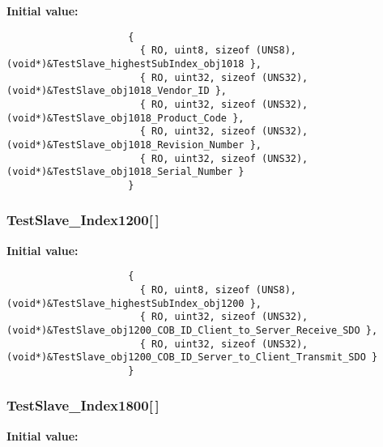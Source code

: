 \textbf{Initial value:}

\begin{Code}\begin{verbatim} 
                     {
                       { RO, uint8, sizeof (UNS8), (void*)&TestSlave_highestSubIndex_obj1018 },
                       { RO, uint32, sizeof (UNS32), (void*)&TestSlave_obj1018_Vendor_ID },
                       { RO, uint32, sizeof (UNS32), (void*)&TestSlave_obj1018_Product_Code },
                       { RO, uint32, sizeof (UNS32), (void*)&TestSlave_obj1018_Revision_Number },
                       { RO, uint32, sizeof (UNS32), (void*)&TestSlave_obj1018_Serial_Number }
                     }
\end{verbatim}\end{Code}
\subsubsection{ {\bf Test\-Slave\_\-Index1200}[$\,$]}\label{TestSlave_8c_f35f0b528d8f97712e1eec1d188650cf}


\textbf{Initial value:}

\begin{Code}\begin{verbatim} 
                     {
                       { RO, uint8, sizeof (UNS8), (void*)&TestSlave_highestSubIndex_obj1200 },
                       { RO, uint32, sizeof (UNS32), (void*)&TestSlave_obj1200_COB_ID_Client_to_Server_Receive_SDO },
                       { RO, uint32, sizeof (UNS32), (void*)&TestSlave_obj1200_COB_ID_Server_to_Client_Transmit_SDO }
                     }
\end{verbatim}\end{Code}
\subsubsection{ {\bf Test\-Slave\_\-Index1800}[$\,$]}\label{TestSlave_8c_594a7232db12e4934ed9b4b73f211844}


\textbf{Initial value:}

